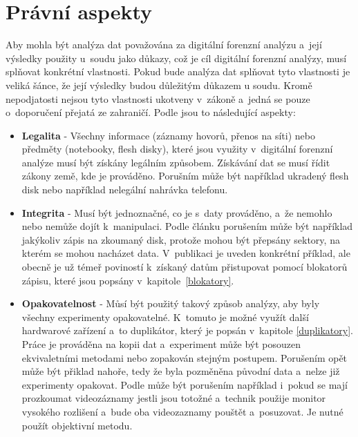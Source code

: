 \documentclass[thesis=B,czech]{FITthesis}[2012/06/26]
\begin{document}
\section{Právní aspekty}

Aby mohla být analýza dat považována za digitální forenzní analýzu a~její výsledky použity u~soudu jako důkazy, což je cíl digitální forenzní analýzy, musí splňovat konkrétní vlastnosti. Pokud bude analýza dat splňovat tyto vlastnosti je veliká šánce, že její výsledky budou důležitým důkazem u soudu. Kromě nepodjatosti nejsou tyto vlastnosti ukotveny v~zákoně a~jedná se pouze o~doporučení přejatá ze zahraničí. Podle \cite{svetlik2010digitalni} jsou to následující aspekty:

\begin{itemize}

\item \textbf{Legalita} - Všechny informace (záznamy hovorů, přenos na síti) nebo předměty (notebooky, flesh disky), které jsou využity v~digitální forenzní analýze musí být získány legálním způsobem. Získávání dat se musí řídit zákony země, kde je prováděno. Porušním může být například ukradený flesh disk nebo například nelegální nahrávka telefonu. 

\item \textbf{Integrita} - Musí být jednoznačné, co je s~daty prováděno, a~že nemohlo nebo nemůže dojít k~manipulaci. Podle článku \cite{svetlik2010digitalni} porušením může být například jakýkoliv zápis na zkoumaný disk, protože mohou být přepsány sektory, na kterém se mohou nacházet data. V~publikaci je uveden konkrétní příklad, ale obecně je už témeř poviností k~získaný datům přistupovat pomocí blokatorů zápisu, které jsou popsány v~kapitole~\ref{blokatory}.

\item \textbf{Opakovatelnost} - Můsí být použitý takový způsob analýzy, aby byly všechny experimenty opakovatelné. K~tomuto je možné využít další hardwarové zařízení a~to duplikátor, který je popsán v~kapitole \ref{duplikatory}. Práce je prováděna na kopii dat a~experiment může být posouzen ekvivaletními metodami nebo zopakován stejným postupem. Porušením opět může být přiklad nahoře, tedy že byla pozměněna původní data a~nelze již experimenty opakovat. Podle \cite{svetlik2010digitalni} může být porušením například i~pokud se mají prozkoumat videozáznamy jestli jsou totožné a~technik použije monitor vysokého rozlišení a~bude oba videozaznamy pouštět a~posuzovat. Je nutné použít objektivní metodu.


\end{itemize}
\end{document}

